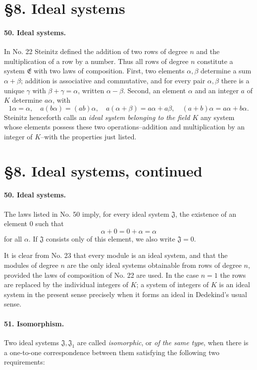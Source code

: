 \documentclass[11pt]{article}
\begin{document}
\section*{\S 8. Ideal systems}

\paragraph{50. Ideal systems.}
In No. 22 Steinitz defined the addition of two rows of degree $n$ and the multiplication of a row by a number. Thus all rows of degree $n$ constitute a system $\mathfrak E$ with two laws of composition. First, two elements $\alpha,
\beta$ determine a sum $\alpha+
\beta$; addition is associative and commutative, and for every pair $\alpha,
\beta$ there is a unique $\gamma$ with $\beta+
\gamma=\alpha$, written $\alpha-
\beta$. Second, an element $\alpha$ and an integer $a$ of $K$ determine $a\alpha$, with
\[
1\alpha=\alpha,
\quad a(b\alpha)=(ab)\alpha,
\quad a(\alpha+
\beta)=a\alpha+a\beta,
\quad (a+b)\alpha=a\alpha+b\alpha.
\]
Steinitz henceforth calls an \emph{ideal system belonging to the field $K$} any system whose elements possess these two operations--addition and multiplication by an integer of $K$--with the properties just listed.

\section*{\S 8. Ideal systems, continued}

\paragraph{50. Ideal systems.}
The laws listed in No. 50 imply, for every ideal system $\mathfrak J$, the existence of an element $0$ such that
\[
  \alpha+0=0+\alpha=\alpha
\]
for all $\alpha$. If $\mathfrak J$ consists only of this element, we also write $\mathfrak J=0$.

It is clear from No. 23 that every module is an ideal system, and that the modules of degree $n$ are the only ideal systems obtainable from rows of degree $n$, provided the laws of composition of No. 22 are used. In the case $n=1$ the rows are replaced by the individual integers of $K$; a system of integers of $K$ is an ideal system in the present sense precisely when it forms an ideal in Dedekind's usual sense.

\paragraph{51. Isomorphism.}
Two ideal systems $\mathfrak J,\mathfrak J_1$ are called \emph{isomorphic}, or \emph{of the same type}, when there is a one-to-one correspondence between them satisfying the following two requirements:
\end{document}
